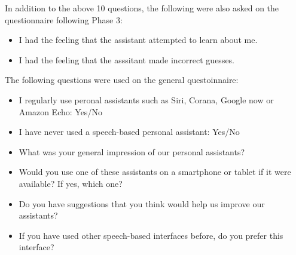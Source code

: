 \documentclass[11pt]{article}
\begin{document}
\noindent
In addition to the above 10 questions, the following were also asked on the questionnaire following Phase 3:
\begin{itemize}
 \item I had the feeling that the assistant attempted to learn about me.
 \item I had the feeling that the asssitant made incorrect guesses. 
\end{itemize}

\noindent
The following questions were used on the general questoinnaire:
\begin{itemize}
 \item I regularly use peronal assistants such as Siri, Corana, Google now or Amazon Echo: Yes/No
 \item I have never used a speech-based personal assistant: Yes/No
 \item What was your general impression of our personal assistants?
 \item Would you use one of these assistants on a smartphone or tablet if it were available? If yes, which one?
 \item Do you have suggestions that you think would help us improve our assistants?
 \item If you have used other speech-based interfaces before, do you prefer this interface?
\end{itemize}




\end{document}
